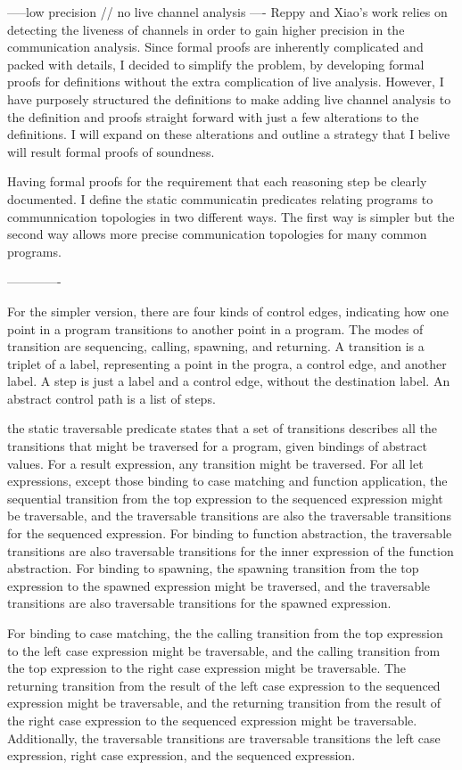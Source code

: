 \documentclass{article}
\begin{document}
-----low precision // no live channel analysis ----
Reppy and Xiao's work relies on detecting the liveness of channels in order to gain higher
precision in the communication analysis.  Since formal proofs are inherently complicated and
packed with details, I decided to simplify the problem, by developing formal proofs for
definitions without the extra complication of live analysis. However, I have purposely
structured the definitions to make adding live channel analysis to the definition and proofs
straight forward with just a few alterations to the definitions.  I will expand on these
alterations and outline a strategy that I belive will result formal proofs of soundness.  

Having formal proofs for the requirement that each reasoning step be clearly documented.
I define the static communicatin predicates relating programs to communnication topologies in
two different ways.  The first way is simpler but the second way allows more precise
communication topologies for many common programs.


-------------

For the simpler version, there are four kinds of control edges, indicating how one point in a
program transitions to another point in a program.  The modes of transition are sequencing,
calling, spawning, and returning. A transition is a triplet of a label, representing a point in
the progra, a control edge, and another label.  A step is just a label and a control edge,
without the destination label.  An abstract control path is a list of steps.  

the static traversable predicate states that a set of transitions describes all the transitions
that might be traversed for a program, given bindings of abstract values.  For a result
expression, any transition might be traversed.  For all let expressions, except those binding
to case matching and function application, the sequential transition from the top expression to
the sequenced expression might be traversable, and the traversable transitions are also the
traversable transitions for the sequenced expression.  For binding to function abstraction, the
traversable transitions are also traversable transitions for the inner expression of the
function abstraction.  For binding to spawning, the spawning transition from the top expression
to the spawned expression might be traversed, and the traversable transitions are also
traversable transitions for the spawned expression.

For binding to case matching, the the calling transition from the top expression to the left
case expression might be traversable, and the calling transition from the top expression to the
right case expression might be traversable.  The returning transition from the result of the
left case expression to the sequenced expression might be traversable, and the returning
transition from the result of the right case expression to the sequenced expression might be
traversable.  Additionally, the traversable transitions are traversable transitions the left
case expression, right case expression, and the sequenced expression.   
\end{document}
